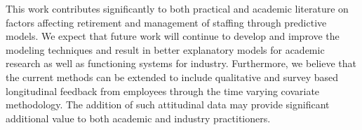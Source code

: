 \documentclass[12pt,letterpaper]{article}
\begin{document}
This work contributes significantly to both practical and academic literature on factors affecting retirement and management of staffing through predictive models. We expect that future work will continue to develop and improve the modeling techniques and result in better explanatory models for academic research as well as functioning systems for industry.  Furthermore, we believe that the current methods can be extended to include qualitative and survey based longitudinal feedback from employees through the time varying covariate methodology.  The addition of such attitudinal data may provide significant additional value to both academic and industry practitioners.


	
\end{document}
